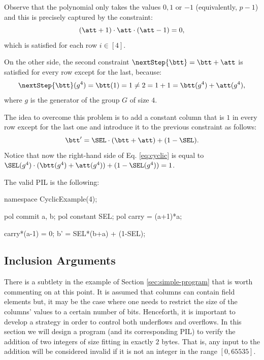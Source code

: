 Observe that the polynomial \att only takes the values $0, 1$ or $-1$ (equivalently, $p-1$) and this is precisely captured by the constraint: 
\[
(\att+1) \cdot \att \cdot (\att-1) = 0,
\]
which is satisfied for each row $i \in [4]$.

On the other side, the second constraint $\nextStep{\btt} = \btt + \att$ is satisfied for every row except for the last, because: 
\begin{equation}\label{eq:cyclic}
\nextStep{\btt}(g^4) = \btt(1) = 1 \neq 2 = 1 + 1 = \btt(g^4) + \att(g^4),
\end{equation}
where $g$ is the generator of the group $G$ of size $4$.

The idea to overcome this problem is to add a constant column \SEL that is $1$ in every row except for the last one and introduce it to the previous constraint as follows:
\[
    \btt' = \SEL \cdot (\btt+\att) + (1-\SEL).
\]
Notice that now the right-hand side of Eq. \eqref{eq:cyclic} is equal to $\SEL(g^4) \cdot (\btt(g^4) + \att(g^4)) + (1-\SEL(g^4)) = 1$.

The valid PIL is the following:
\begin{pil}
namespace CyclicExample(4);

    pol commit a, b;
    pol constant SEL;
    pol carry = (a+1)*a;

    carry*(a-1) = 0;
    b' = SEL*(b+a) + (1-SEL);
\end{pil}










\subsection{Inclusion Arguments}

There is a subtlety in the \Multiplier example of Section \ref{sec:simple-program} that is worth commenting on at this point. It is assumed that columns can contain field elements but, it may be the case where one needs to restrict the size of the columns' values to a certain number of bits. Henceforth, it is important to develop a strategy in order to control both underflows and overflows. In this section we will design a program (and its corresponding PIL) to verify the addition of two integers of size fitting in exactly $2$ bytes. That is, any input to the addition will be considered invalid if it is not an integer in the range $[0,65535]$.

